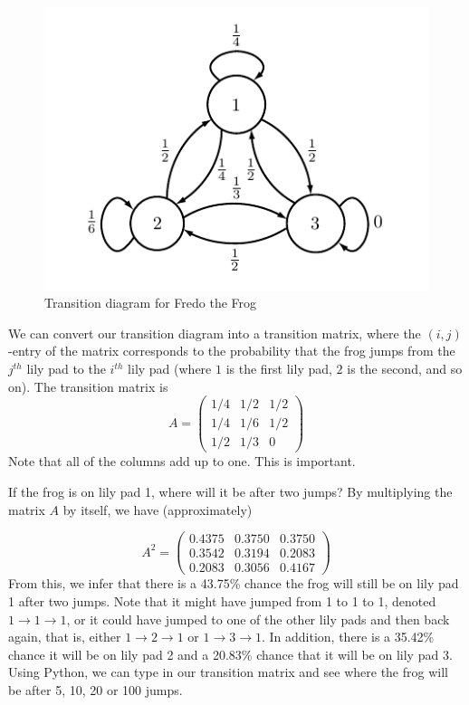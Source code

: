 \begin{figure}[h]
\includegraphics[width=\textwidth]{markov1}
\caption{Transition diagram for Fredo the Frog}
\label{fig:markov1}
\end{figure}

We can convert our transition diagram into a transition matrix, where the $(i,j)$-entry of the matrix corresponds to the probability that the frog jumps from the $j^{th}$ lily pad to the $i^{th}$ lily pad (where $1$ is the first lily pad, $2$ is the second, and so on).
The transition matrix is
\[
A = \begin{pmatrix}
1/4 & 1/2 & 1/2\\
1/4 & 1/6 & 1/2\\
1/2 & 1/3 & 0
\end{pmatrix}
\]
Note that all of the columns add up to one.
This is important.

If the frog is on lily pad 1, where will it be after two jumps?
By multiplying the matrix $A$ by itself, we have (approximately)

\[
A^2 = \begin{pmatrix}
0.4375 & 0.3750 & 0.3750\\
0.3542 & 0.3194 & 0.2083\\
0.2083 & 0.3056 & 0.4167
\end{pmatrix}
\]
From this, we infer that there is a 43.75\% chance the frog will still be on lily pad 1 after two jumps.
Note that it might have jumped from 1 to 1 to 1, denoted $1 \rightarrow 1 \rightarrow 1$, or it could have jumped to one of the other lily pads and then back again, that is, either $1 \rightarrow 2 \rightarrow 1$ or $1 \rightarrow 3 \rightarrow 1$.
In addition, there is a 35.42\% chance it will be on lily pad 2 and a 20.83\% chance that it will be on lily pad 3.
Using Python, we can type in our transition matrix and see where the frog will be after 5, 10, 20 or 100 jumps.

